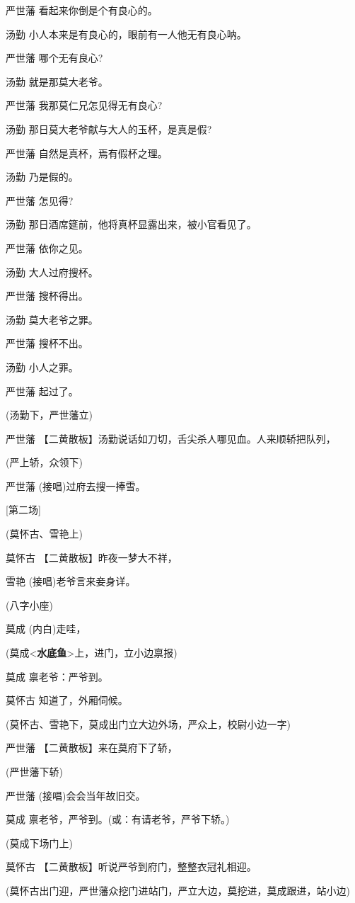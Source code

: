 严世藩 看起来你倒是个有良心的。

汤勤 小人本来是有良心的，眼前有一人他无有良心呐。

严世藩 哪个无有良心?

汤勤 就是那莫大老爷。

严世藩 我那莫仁兄怎见得无有良心?

汤勤 那日莫大老爷献与大人的玉杯，是真是假?

严世藩 自然是真杯，焉有假杯之理。

汤勤 乃是假的。

严世藩 怎见得?

汤勤 那日酒席筵前，他将真杯显露出来，被小官看见了。

严世藩 依你之见。

汤勤 大人过府搜杯。

严世藩 搜杯得出。

汤勤 莫大老爷之罪。

严世藩 搜杯不出。

汤勤 小人之罪。

严世藩 起过了。

(汤勤下，严世藩立)

严世藩 【二黄散板】汤勤说话如刀切，舌尖杀人哪见血。人来顺轿把队列，

(严上轿，众领下)

严世藩 (接唱)过府去搜一捧雪。

{[}第二场{]}

(莫怀古、雪艳上)

莫怀古 【二黄散板】昨夜一梦大不祥，

雪艳 (接唱)老爷言来妾身详。

(八字小座)

莫成 (内白)走哇，

(莫成\textless{}\textbf{水底鱼}\textgreater{}上，进门，立小边禀报)

莫成 禀老爷：严爷到。

莫怀古 知道了，外厢伺候。

(莫怀古、雪艳下，莫成出门立大边外场，严众上，校尉小边一字)

严世藩 【二黄散板】来在莫府下了轿，

(严世藩下轿)

严世藩 (接唱)会会当年故旧交。

莫成 禀老爷，严爷到。(或：有请老爷，严爷下轿。)

(莫成下场门上)

莫怀古 【二黄散板】听说严爷到府门，整整衣冠礼相迎。

(莫怀古出门迎，严世藩众挖门进站门，严立大边，莫挖进，莫成跟进，站小边)

